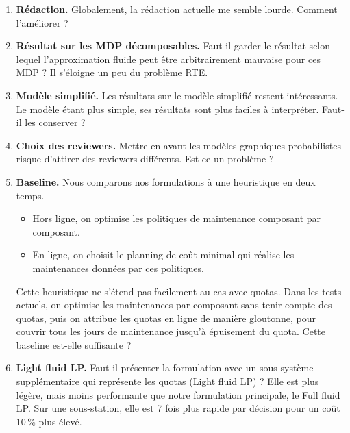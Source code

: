 \documentclass[11pt,a4paper]{article}
\begin{document}
\begin{enumerate}
\item \textbf{Rédaction.} Globalement, la rédaction actuelle me semble lourde. Comment l'améliorer ?
\item \textbf{Résultat sur les MDP décomposables.} Faut-il garder le résultat selon lequel l'approximation fluide peut
être arbitrairement mauvaise pour ces MDP ? Il s'éloigne un peu du problème RTE.
\item \textbf{Modèle simplifié.} Les résultats sur le modèle simplifié restent intéressants. Le modèle étant plus
simple, ses résultats sont plus faciles à interpréter. Faut-il les conserver ?
\item \textbf{Choix des reviewers.} Mettre en avant les modèles graphiques probabilistes risque d'attirer des
reviewers différents. Est-ce un problème ?
\item \textbf{Baseline.} Nous comparons nos formulations à une heuristique en deux temps.
\begin{itemize}
\item Hors ligne, on optimise les politiques de maintenance composant par composant.
\item En ligne, on choisit le planning de coût minimal qui réalise les maintenances données par ces politiques.
\end{itemize}
Cette heuristique ne s'étend pas facilement au cas avec quotas. Dans les tests actuels, on optimise les maintenances
par composant sans tenir compte des quotas, puis on attribue les quotas en ligne de manière gloutonne, pour couvrir
tous les jours de maintenance jusqu'à épuisement du quota. Cette baseline est-elle suffisante ?
\item \textbf{Light fluid LP.} Faut-il présenter la formulation avec un sous-système supplémentaire qui représente les
quotas (Light fluid LP) ? Elle est plus légère, mais moins performante que notre formulation principale, le Full
fluid LP. Sur une sous-station, elle est 7 fois plus rapide par décision pour un coût 10\,\% plus élevé.
\end{enumerate}
\end{document}
